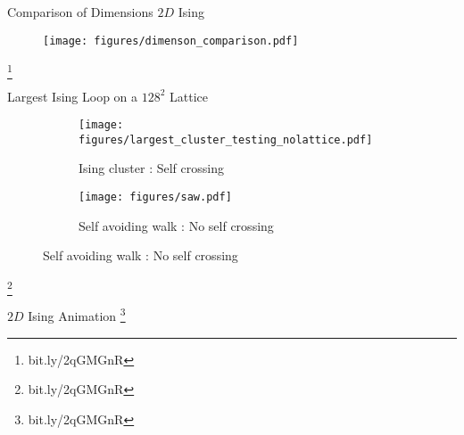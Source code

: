 \documentclass[10pt]{beamer}
\newcommand\blfootnote[1]{%
  \begingroup
  \renewcommand\thefootnote{}\footnote{#1}%
  \addtocounter{footnote}{-1}%
  \endgroup
}
\begin{document}
\begin{frame}{Comparison of Dimensions $2D$ Ising}
    \begin{figure}[h!]
        \centering
            \texttt{[image: figures/dimenson\_comparison.pdf]}
    \end{figure}
    \blfootnote{bit.ly/2qGMGnR}
\end{frame}

\begin{frame}{Largest Ising Loop on a $128^2$ Lattice}
    \begin{figure}[h!]
\centering
    \begin{subfigure}{.45\textwidth}
        \centering
        \texttt{[image: figures/largest\_cluster\_testing\_nolattice.pdf]}
        \caption{Ising cluster : Self crossing}
    \end{subfigure}
    \begin{subfigure}{.45\textwidth}
        \centering
        \texttt{[image: figures/saw.pdf]}
        \caption{Self avoiding walk : No self crossing}
    \end{subfigure}
\end{figure}
\blfootnote{bit.ly/2qGMGnR}
\end{frame}

\begin{frame}{$2D$ Ising Animation}
     \blfootnote{bit.ly/2qGMGnR}
\end{frame}
\end{document}
